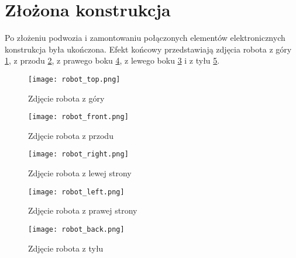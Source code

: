 \section{Złożona konstrukcja}
Po złożeniu podwozia i zamontowaniu połączonych elementów elektronicznych konstrukcja była ukończona.
Efekt końcowy przedstawiają zdjęcia robota z góry \ref{rys:robot_top}, z przodu \ref{rys:robot_front}, z prawego boku \ref{rys:robot_right}, z lewego boku \ref{rys:robot_left} i z tyłu \ref{rys:robot_back}.
\begin{figure}[!hb]
    \centering \texttt{[image: robot\_top.png]}
    \caption{Zdjęcie robota z góry}
    \label{rys:robot_top}
\end{figure}
\begin{figure}[!hb]
    \centering \texttt{[image: robot\_front.png]}
    \caption{Zdjęcie robota z przodu}
    \label{rys:robot_front}
\end{figure}
\begin{figure}[!hb]
    \centering \texttt{[image: robot\_right.png]}
    \caption{Zdjęcie robota z lewej strony}
    \label{rys:robot_left}
\end{figure}
\begin{figure}[!hb]
    \centering \texttt{[image: robot\_left.png]}
    \caption{Zdjęcie robota z prawej strony}
    \label{rys:robot_right}
\end{figure}
\begin{figure}[!hb]
    \centering \texttt{[image: robot\_back.png]}
    \caption{Zdjęcie robota z tyłu}
    \label{rys:robot_back}
\end{figure}
